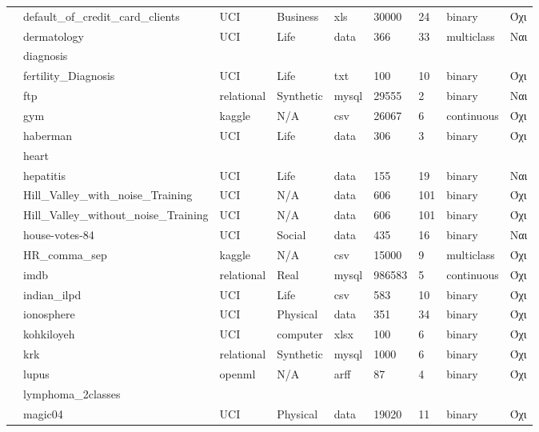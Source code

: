 \begin{longtable}{| p{} | p{}| p{} | p{} | p{} | p{} | p{} | p{} | p{} | }
 			\rownumber & default\_of\_credit\_card\_clients \citep{default} & UCI & Business & xls & 30000 & 24 & binary & Όχι \\
 			\rownumber & dermatology \citep{dermatology} & UCI & Life & data & 366 & 33 & multiclass & Ναι \\
 			\rownumber & diagnosis & & & & & & & \\
 			\rownumber & fertility\_Diagnosis & UCI & Life & txt & 100 & 10 & binary & Όχι \\
 		    \rownumber & ftp \citep{ftp} & relational & Synthetic & mysql & 29555  & 2 & binary  & Ναι  \\
 			\rownumber & gym \citep{gym} & kaggle & N/A & csv & 26067 & 6 & continuous & Όχι \\
 			\rownumber & haberman \citep{haberman} & UCI & Life & data &  306 & 3 & binary & Όχι \\
 			\rownumber & heart & & & & & & & \\
 			\rownumber & hepatitis \citep{hepatitis} & UCI & Life & data & 155 & 19 & binary & Ναι \\
 			\rownumber & Hill\_Valley\_with\_noise\_Training & UCI & N/A & data & 606 & 101 & binary & Όχι \\
 			\rownumber & Hill\_Valley\_without\_noise\_Training & UCI & N/A & data & 606 & 101 & binary & Όχι \\
 			\rownumber & house-votes-84 & UCI & Social & data & 435 & 16  & binary & Ναι  \\
 			\rownumber & HR\_comma\_sep \citep{hr} & kaggle & N/A & csv & 15000 & 9 & multiclass & Όχι \\
 			\rownumber & imdb \citep{imdb} & relational & Real & mysql & 986583 & 5 & continuous & Όχι \\
 			\rownumber & indian\_ilpd & UCI & Life & csv & 583 & 10 & binary & Όχι \\
 			\rownumber & ionosphere \citep{ionoshpere} & UCI & Physical & data  & 351 & 34  &  binary & Όχι \\
 			\rownumber & kohkiloyeh & UCI & computer& xlsx& 100 & 6 & binary & Όχι \\
 			\rownumber & krk \citep{krk} & relational & Synthetic & mysql & 1000  & 6 & binary & Όχι \\
 			\rownumber & lupus \citep{lupus} & openml & N/A & arff & 87 & 4 & binary & Όχι \\
 			\rownumber & lymphoma\_2classes & & & & & & & \\
 			\rownumber & magic04 & UCI & Physical & data & 19020 & 11 & binary & Όχι \\

\end{longtable}
